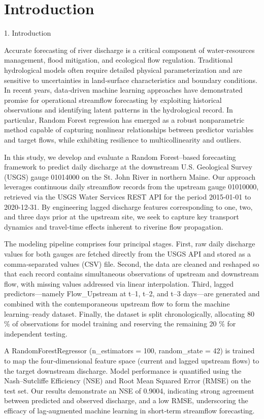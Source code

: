 \documentclass[preprint,12pt]{elsarticle}
\begin{document}
\section{Introduction}

1. Introduction

Accurate forecasting of river discharge is a critical component of water‐resources management, flood mitigation, and ecological flow regulation. Traditional hydrological models often require detailed physical parameterization and are sensitive to uncertainties in land‐surface characteristics and boundary conditions. In recent years, data‐driven machine learning approaches have demonstrated promise for operational streamflow forecasting by exploiting historical observations and identifying latent patterns in the hydrological record. In particular, Random Forest regression has emerged as a robust nonparametric method capable of capturing nonlinear relationships between predictor variables and target flows, while exhibiting resilience to multicollinearity and outliers.

In this study, we develop and evaluate a Random Forest–based forecasting framework to predict daily discharge at the downstream U.S. Geological Survey (USGS) gauge 01014000 on the St. John River in northern Maine. Our approach leverages continuous daily streamflow records from the upstream gauge 01010000, retrieved via the USGS Water Services REST API for the period 2015-01-01 to 2020-12-31. By engineering lagged discharge features corresponding to one, two, and three days prior at the upstream site, we seek to capture key transport dynamics and travel‐time effects inherent to riverine flow propagation.

The modeling pipeline comprises four principal stages. First, raw daily discharge values for both gauges are fetched directly from the USGS API and stored as a comma‐separated values (CSV) file. Second, the data are cleaned and reshaped so that each record contains simultaneous observations of upstream and downstream flow, with missing values addressed via linear interpolation. Third, lagged predictors—namely Flow\_Upstream at t–1, t–2, and t–3 days—are generated and combined with the contemporaneous upstream flow to form the machine learning–ready dataset. Finally, the dataset is split chronologically, allocating 80 \% of observations for model training and reserving the remaining 20 \% for independent testing.

A RandomForestRegressor (n\_estimators = 100, random\_state = 42) is trained to map the four‐dimensional feature space (current and lagged upstream flows) to the target downstream discharge. Model performance is quantified using the Nash–Sutcliffe Efficiency (NSE) and Root Mean Squared Error (RMSE) on the test set. Our results demonstrate an NSE of 0.9004, indicating strong agreement between predicted and observed discharge, and a low RMSE, underscoring the efficacy of lag‐augmented machine learning in short‐term streamflow forecasting.
\end{document}
